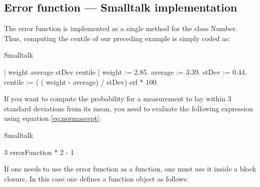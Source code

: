 \subsection{Error function --- Smalltalk implementation}
\label{sec:sterrorfunction}  The error function is
implemented as a single method for the class Number. Thus,
computing the centile of our preceding example is simply coded as:
\begin{listing}{Smalltalk}

 | weight average stDev centile |
 weight := 2.85.
 average := 3.39.
 stDev := 0.44.
 centile := ( ( weight - average) / stDev) erf * 100.
\end{listing}
If you want to compute the probability for a measurement to lay
within 3 standard deviations from its mean, you need to evaluate
the following expression using equation \ref{eq:normaccept}:
\begin{listing}{Smalltalk}

 3 errorFunction * 2 - 1
\end{listing}
If one needs to use the error function as a function, one must use
it inside a block closure. In this case one defines a function
object as follows:
